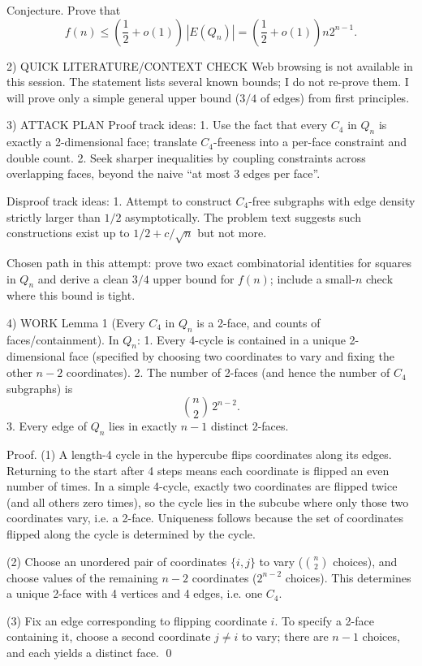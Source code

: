 Conjecture.
Prove that
\[f(n)\le \left(\frac12+o(1)\right)\,|E(Q_n)|=\left(\frac12+o(1)\right)n2^{n-1}.\]

2) QUICK LITERATURE/CONTEXT CHECK
Web browsing is not available in this session.
The statement lists several known bounds; I do not re-prove them.
I will prove only a simple general upper bound ($3/4$ of edges) from first principles.

3) ATTACK PLAN
Proof track ideas:
1. Use the fact that every $C_4$ in $Q_n$ is exactly a 2-dimensional face; translate $C_4$-freeness into a per-face constraint and double count.
2. Seek sharper inequalities by coupling constraints across overlapping faces, beyond the naive ``at most 3 edges per face''.

Disproof track ideas:
1. Attempt to construct $C_4$-free subgraphs with edge density strictly larger than $1/2$ asymptotically.
The problem text suggests such constructions exist up to $1/2+c/\sqrt n$ but not more.

Chosen path in this attempt: prove two exact combinatorial identities for squares in $Q_n$ and derive a clean $3/4$ upper bound for $f(n)$; include a small-$n$ check where this bound is tight.

4) WORK
Lemma 1 (Every $C_4$ in $Q_n$ is a 2-face, and counts of faces/containment).
In $Q_n$:
1. Every 4-cycle is contained in a unique 2-dimensional face (specified by choosing two coordinates to vary and fixing the other $n-2$ coordinates).
2. The number of 2-faces (and hence the number of $C_4$ subgraphs) is
\[\binom{n}{2}\,2^{n-2}.\]
3. Every edge of $Q_n$ lies in exactly $n-1$ distinct 2-faces.

Proof.
(1) A length-4 cycle in the hypercube flips coordinates along its edges. Returning to the start after 4 steps means each coordinate is flipped an even number of times.
In a simple 4-cycle, exactly two coordinates are flipped twice (and all others zero times), so the cycle lies in the subcube where only those two coordinates vary, i.e. a 2-face.
Uniqueness follows because the set of coordinates flipped along the cycle is determined by the cycle.

(2) Choose an unordered pair of coordinates $\{i,j\}$ to vary ($\binom{n}{2}$ choices), and choose values of the remaining $n-2$ coordinates ($2^{n-2}$ choices). This determines a unique 2-face with 4 vertices and 4 edges, i.e. one $C_4$.

(3) Fix an edge corresponding to flipping coordinate $i$. To specify a 2-face containing it, choose a second coordinate $j\ne i$ to vary; there are $n-1$ choices, and each yields a distinct face. \qed

